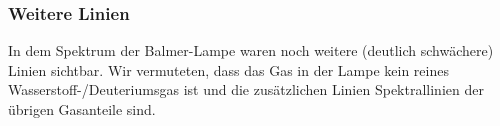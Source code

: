 \subsubsection{Weitere Linien}
In dem Spektrum der Balmer-Lampe waren noch weitere (deutlich schwächere) Linien sichtbar. Wir vermuteten, dass das Gas in der Lampe kein reines Wasserstoff-/Deuteriumsgas ist und die zusätzlichen Linien Spektrallinien der übrigen Gasanteile sind.